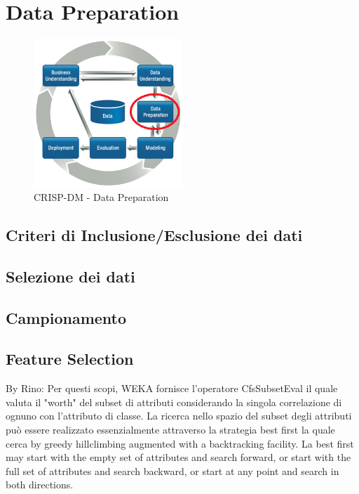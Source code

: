 \chapter{Data Preparation}

\begin{figure}[hbtp]
	\centering
	\includegraphics[width=0.5\textwidth]{./images/CRISPDM_3.png}
	\caption{CRISP-DM - Data Preparation}
	\label{CRISPDM_3}
\end{figure}



\section{Criteri di Inclusione/Esclusione dei dati}


\section{Selezione dei dati}

\section{Campionamento}


\section{Feature Selection}
By Rino:
Per questi scopi, WEKA fornisce l'operatore CfsSubsetEval il quale valuta il "worth" del subset di attributi considerando la singola correlazione di ognuno con l'attributo di classe. La ricerca nello spazio del subset degli attributi può essere realizzato essenzialmente attraverso la strategia best first la quale cerca by greedy hillclimbing augmented with a backtracking facility.
La best first may start with the empty set of attributes and search forward, or start with the full set of attributes and search backward, or start at any point and search in both directions.

